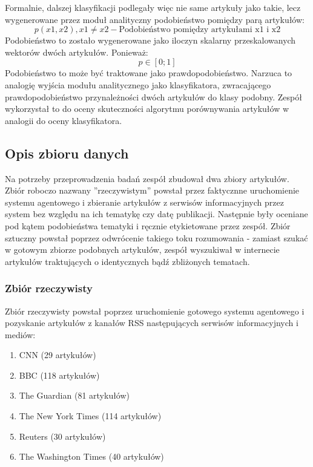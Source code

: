 \par Formalnie, dalszej klasyfikacji podlegały więc nie same artykuły jako takie, lecz wygenerowane przez moduł analityczny podobieństwo pomiędzy parą artykułów:
$$ p(x1, x2), x1 \neq x2 - \text{Podobieństwo pomiędzy artykułami x1 i x2} $$
Podobieństwo to zostało wygenerowane jako iloczyn skalarny przeskalowanych wektorów dwóch artykułów. Ponieważ:
$$ p \in [0;1] $$
Podobieństwo to może być traktowane jako prawdopodobieństwo. Narzuca to analogię wyjścia modułu analitycznego jako klasyfikatora, zwracającego prawdopodobieństwo przynależności dwóch artykułów do klasy podobny. Zespół wykorzystał to do oceny skuteczności algorytmu porównywania artykułów w analogii do oceny klasyfikatora.

\subsection{Opis zbioru danych}

\par Na potrzeby przeprowadzenia badań zespół zbudował dwa zbiory artykułów. Zbiór roboczo nazwany ''rzeczywistym'' powstał przez faktycznne uruchomienie systemu agentowego i zbieranie artykułów z serwisów informacyjnych przez system bez względu na ich tematykę czy datę publikacji. Następnie były oceniane pod kątem podobieństwa tematyki i ręcznie etykietowane przez zespół. Zbiór sztuczny powstał poprzez odwrócenie takiego toku rozumowania - zamiast szukać w gotowym zbiorze podobnych artykułów, zespół wyszukiwał w internecie artykułów traktujących o identycznych bądź zbliżonych tematach.



\subsubsection{Zbiór rzeczywisty}

Zbiór rzeczywisty powstał poprzez uruchomienie gotowego systemu agentowego i pozyskanie artykułów z kanałów RSS następujących serwisów informacyjnych i mediów:
 
\begin{enumerate}
    \item CNN (29 artykułów)
    \item BBC (118 artykułów)
    \item The Guardian (81 artykułów)
    \item The New York Times (114 artykułów)
    \item Reuters (30 artykułów)
    \item The Washington Times (40 artykułów)
\end{enumerate}
 
